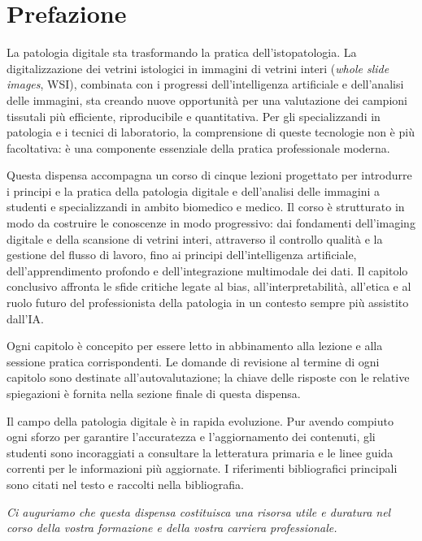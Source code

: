 \documentclass[12pt, a4paper, twoside]{book}
\begin{document}
\frontmatter

\chapter*{Prefazione}

La patologia digitale sta trasformando la pratica dell'istopatologia. La digitalizzazione dei
vetrini istologici in immagini di vetrini interi (\emph{whole slide images}, WSI), combinata con
i progressi dell'intelligenza artificiale e dell'analisi delle immagini, sta creando nuove
opportunità per una valutazione dei campioni tissutali più efficiente, riproducibile e
quantitativa. Per gli specializzandi in patologia e i tecnici di laboratorio, la comprensione di
queste tecnologie non è più facoltativa: è una componente essenziale della pratica professionale
moderna.

Questa dispensa accompagna un corso di cinque lezioni progettato per introdurre i principi e la
pratica della patologia digitale e dell'analisi delle immagini a studenti e specializzandi in
ambito biomedico e medico. Il corso è strutturato in modo da costruire le conoscenze in modo
progressivo: dai fondamenti dell'imaging digitale e della scansione di vetrini interi, attraverso
il controllo qualità e la gestione del flusso di lavoro, fino ai principi dell'intelligenza
artificiale, dell'apprendimento profondo e dell'integrazione multimodale dei dati. Il capitolo
conclusivo affronta le sfide critiche legate al bias, all'interpretabilità, all'etica e al ruolo
futuro del professionista della patologia in un contesto sempre più assistito dall'IA.

Ogni capitolo è concepito per essere letto in abbinamento alla lezione e alla sessione pratica
corrispondenti. Le domande di revisione al termine di ogni capitolo sono destinate
all'autovalutazione; la chiave delle risposte con le relative spiegazioni è fornita nella sezione
finale di questa dispensa.

Il campo della patologia digitale è in rapida evoluzione. Pur avendo compiuto ogni sforzo per
garantire l'accuratezza e l'aggiornamento dei contenuti, gli studenti sono incoraggiati a
consultare la letteratura primaria e le linee guida correnti per le informazioni più aggiornate.
I riferimenti bibliografici principali sono citati nel testo e raccolti nella bibliografia.

\vspace{1em}
\noindent\textit{Ci auguriamo che questa dispensa costituisca una risorsa utile e duratura nel
corso della vostra formazione e della vostra carriera professionale.}
\end{document}
